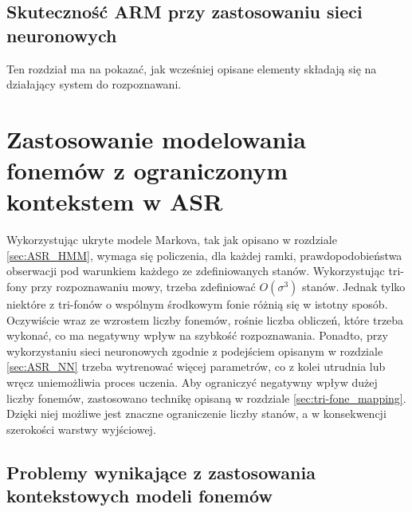 \documentclass[11pt]{article}
\begin{document}
	\subsection{Skuteczność ARM przy zastosowaniu sieci neuronowych}
	
	Ten rozdział ma na pokazać, jak wcześniej opisane elementy składają się na działający system do rozpoznawani.

\section{ Zastosowanie modelowania fonemów z ograniczonym kontekstem w ASR }	
	Wykorzystując ukryte modele Markova, tak jak opisano w rozdziale \ref{sec:ASR_HMM}, wymaga się policzenia, dla każdej ramki, prawdopodobieństwa obserwacji pod warunkiem każdego ze zdefiniowanych stanów. Wykorzystując tri-fony przy rozpoznawaniu mowy, trzeba zdefiniować $O(\sigma^3)$ stanów. Jednak tylko niektóre z tri-fonów o wspólnym środkowym fonie różnią się w istotny sposób. Oczywiście wraz ze wzrostem liczby fonemów, rośnie liczba obliczeń, które trzeba wykonać, co ma negatywny wpływ na szybkość rozpoznawania. Ponadto, przy wykorzystaniu sieci neuronowych zgodnie z podejściem opisanym w rozdziale \ref{sec:ASR_NN} trzeba wytrenować więcej parametrów, co z kolei utrudnia lub wręcz uniemożliwia proces uczenia. Aby ograniczyć negatywny wpływ dużej liczby fonemów, zastosowano technikę opisaną w rozdziale \ref{sec:tri-fone_mapping}. Dzięki niej możliwe jest znaczne ograniczenie liczby stanów, a w konsekwencji szerokości warstwy wyjściowej.
	
	\subsection{ Problemy wynikające z zastosowania kontekstowych modeli fonemów }
\end{document}
